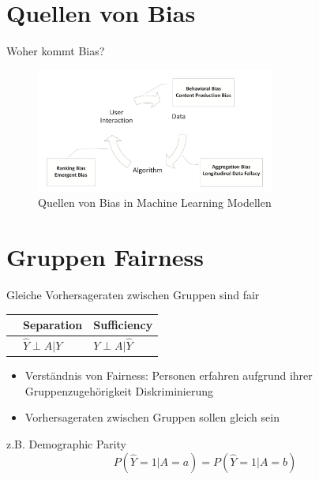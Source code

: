 \documentclass[aspectratio=169]{beamer}
\begin{document}
\section{Quellen von Bias}
\begin{frame}{Woher kommt Bias?}
	\begin{figure}
		\centering
		\includegraphics[width=0.7\textwidth]{../figures/bias_loop.png}
		\caption{Quellen von Bias in Machine Learning Modellen \cite{mehrabi2022}}
	\end{figure}
\end{frame}



\section{Gruppen Fairness}
\begin{frame}[t]{Gleiche Vorhersageraten zwischen Gruppen sind fair} %
    \vspace*{0.3cm} %
	\begin{table}
        \begin{tabular}{lll}
            \toprule
            \color{orange}{Independence} & Separation & Sufficiency \\
            \midrule
            \color{orange}{$\hat{Y} \perp A$} & $\hat{Y} \perp A | Y$ & $Y \perp A | \hat{Y}$\\
            \bottomrule
        \end{tabular}
    \end{table}
	\begin{itemize}
		\item Verständnis von Fairness: Personen erfahren aufgrund ihrer Gruppenzugehörigkeit Diskriminierung
		\item Vorhersageraten zwischen Gruppen sollen gleich sein
	\end{itemize}
	z.B. Demographic Parity \cite{verma2018} \\
	$$P(\hat{Y} = 1 | A = a) = P(\hat{Y} = 1 | A = b)$$
\end{frame}
\end{document}
